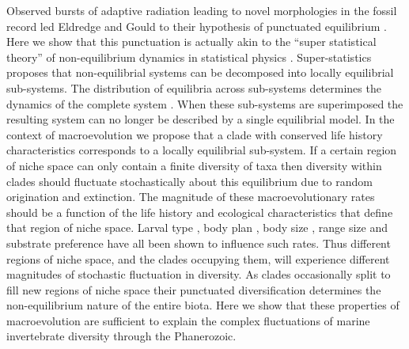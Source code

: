 Observed bursts of adaptive radiation leading to novel morphologies in
the fossil record led Eldredge and Gould to their hypothesis of
punctuated equilibrium \citep{eldredgeGould1972}. Here we show that
this punctuation is actually akin to the ``super statistical theory''
of non-equilibrium dynamics in statistical physics
\citep{beck2003}. Super-statistics \citep{beck2003} proposes that
non-equilibrial systems can be decomposed into locally equilibrial
sub-systems. The distribution of equilibria across sub-systems
determines the dynamics of the complete system \citep{beck2003}. When
these sub-systems are superimposed the resulting system can no longer
be described by a single equilibrial model. In the context of
macroevolution we propose that a clade with conserved life history
characteristics corresponds to a locally equilibrial sub-system. If a
certain region of niche space can only contain a finite diversity of
taxa \citep{simpson1953, gavrilets2005, rabosky2009ecolLett, price2014}
then diversity within clades should fluctuate stochastically about
this equilibrium due to random origination and extinction. The
magnitude of these macroevolutionary rates should be a function of the
life history and ecological characteristics that define that region of
niche space. Larval type \citep{jablonski2008}, body plan
\citep{erwin2012}, body size \citep{harnik2011}, range size
\citep{harnik2011, foote2008paleobiol} and substrate preference
\citep{hopkins2014} have all been shown to influence such rates. Thus
different regions of niche space, and the clades occupying them, will
experience different magnitudes of stochastic fluctuation in
diversity. As clades occasionally split to fill new regions of niche
space their punctuated diversification determines the non-equilibrium
nature of the entire biota. Here we show that these properties of
macroevolution are sufficient to explain the complex fluctuations of
marine invertebrate diversity through the Phanerozoic.

